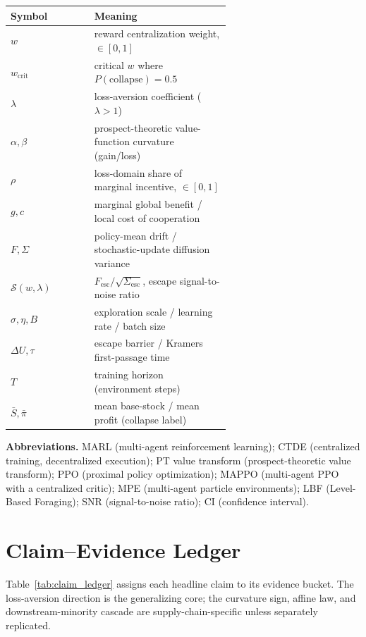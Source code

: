 \documentclass[letterpaper]{article} %
\theoremstyle{plain}
\newcommand{\wcrit}{w_{\mathrm{crit}}}
\begin{document}
\begin{table}[h]
\centering \small
\begin{tabular}{lp{0.62\linewidth}}
\toprule
Symbol & Meaning \\
\midrule
$w$ & reward centralization weight, $\in[0,1]$ \\
$\wcrit$ & critical $w$ where $P(\mathrm{collapse}){=}0.5$ \\
$\lambda$ & loss-aversion coefficient ($\lambda{>}1$) \\
$\alpha,\beta$ & prospect-theoretic value-function curvature (gain/loss) \\
$\rho$ & loss-domain share of marginal incentive, $\in[0,1]$ \\
$g,c$ & marginal global benefit / local cost of cooperation \\
$F,\Sigma$ & policy-mean drift / stochastic-update diffusion variance \\
$\mathcal{S}(w,\lambda)$ & $F_{\mathrm{esc}}/\sqrt{\Sigma_{\mathrm{esc}}}$, escape signal-to-noise ratio \\
$\sigma,\eta,B$ & exploration scale / learning rate / batch size \\
$\Delta U,\tau$ & escape barrier / Kramers first-passage time \\
$T$ & training horizon (environment steps) \\
$\bar S,\bar\pi$ & mean base-stock / mean profit (collapse label) \\
\bottomrule
\end{tabular}
\end{table}

\noindent\textbf{Abbreviations.} MARL (multi-agent reinforcement learning); CTDE (centralized
training, decentralized execution); PT value transform (prospect-theoretic value transform); PPO (proximal policy
optimization); MAPPO (multi-agent PPO with a centralized critic); MPE (multi-agent particle
environments); LBF (Level-Based Foraging); SNR (signal-to-noise ratio); CI (confidence
interval).

\section{Claim--Evidence Ledger}
\label{sec:s_ledger}

Table~\ref{tab:claim_ledger} assigns each headline claim to its evidence bucket. The loss-aversion
direction is the generalizing core; the curvature sign, affine law, and downstream-minority cascade
are supply-chain-specific unless separately replicated.
\end{document}

